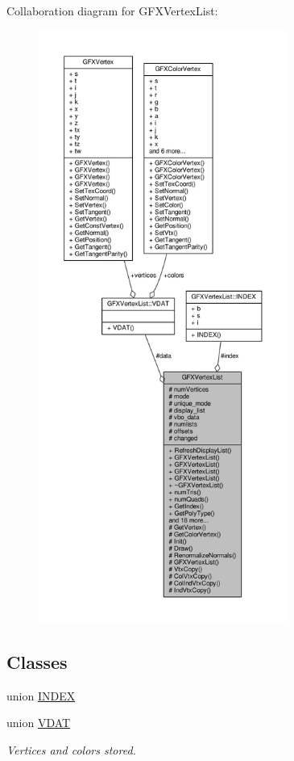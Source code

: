 Collaboration diagram for G\+F\+X\+Vertex\+List\+:
\nopagebreak
\begin{figure}[H]
\begin{center}
\leavevmode
\includegraphics[height=550pt]{d5/d22/classGFXVertexList__coll__graph}
\end{center}
\end{figure}
\subsection*{Classes}
\begin{DoxyCompactItemize}
\item 
union \hyperlink{unionGFXVertexList_1_1INDEX}{I\+N\+D\+EX}
\item 
union \hyperlink{unionGFXVertexList_1_1VDAT}{V\+D\+AT}
\begin{DoxyCompactList}\small\item\em Vertices and colors stored. \end{DoxyCompactList}\end{DoxyCompactItemize}
